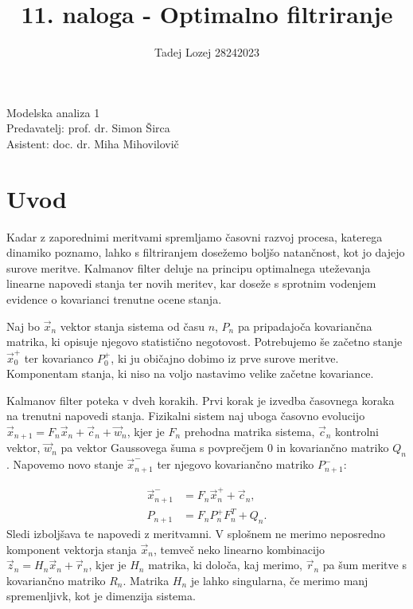 \documentclass[slovene,11pt,a4paper]{article}
\begin{document}
\title{11. naloga - Optimalno filtriranje}
\author{Tadej Lozej 28242023}
\maketitle
\begin{center}
Modelska analiza 1 \\
\bigskip
Predavatelj: prof. dr. Simon Širca \\
Asistent: doc. dr. Miha Mihovilovič
\end{center}

\newpage

\tableofcontents

\newpage

\section{Uvod}


Kadar z zaporednimi meritvami spremljamo časovni razvoj procesa, katerega dinamiko poznamo, lahko s filtriranjem dosežemo boljšo natančnost, kot jo dajejo surove meritve. Kalmanov filter deluje na principu optimalnega uteževanja linearne napovedi stanja ter novih meritev, kar doseže s sprotnim vodenjem evidence o kovarianci trenutne ocene stanja.

Naj bo $\vec{x}_n$ vektor stanja sistema od času $n$, $P_n$ pa pripadajoča kovariančna matrika, ki opisuje njegovo statistično negotovost. Potrebujemo še začetno stanje $\vec{x}_0^+$ ter kovarianco $P_0^+$, ki ju običajno dobimo iz prve surove meritve. Komponentam stanja, ki niso na voljo nastavimo velike začetne kovariance.

Kalmanov filter poteka v dveh korakih. Prvi korak je izvedba časovnega koraka na trenutni napovedi stanja. Fizikalni sistem naj uboga časovno evolucijo $\vec{x}_{n+1} = F_n \vec{x}_n + \vec{c}_n + \vec{w}_n$, kjer je $F_n$ prehodna matrika sistema, $\vec{c}_n$ kontrolni vektor, $\vec{w}_n$ pa vektor Gaussovega šuma s povprečjem $0$ in kovariančno matriko $Q_n$. Napovemo novo stanje $\vec{x}_{n+1}^-$ ter njegovo kovariančno matriko $P_{n+1}^-$:

\begin{align}
\vec{x}_{n+1}^- &= F_n \vec{x}_n^+ + \vec{c}_n, \\
P_{n+1} &= F_n P_n^+ F_n^T + Q_n.
\end{align}
Sledi izboljšava te napovedi z meritvamni. V splošnem ne merimo neposredno komponent vektorja stanja $\vec{x}_n$, temveč neko linearno kombinacijo $\vec{z}_n = H_n \vec{x}_n + \vec{r}_n$, kjer je $H_n$ matrika, ki določa, kaj merimo, $\vec{r}_n$ pa šum meritve s kovariančno matriko $R_n$. Matrika $H_n$ je lahko singularna, če merimo manj spremenljivk, kot je dimenzija sistema.
\end{document}
